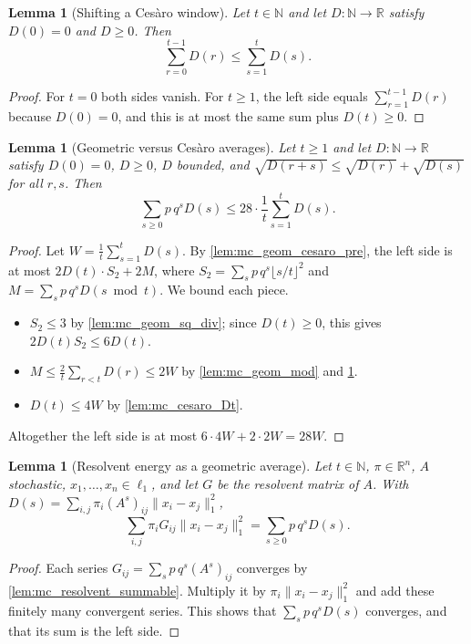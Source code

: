 \documentclass[11pt]{article}
\newtheorem{lemma}[theorem]{Lemma}
\theoremstyle{definition}
\theoremstyle{remark}
\newcommand{\R}{\mathbb{R}}
\newcommand{\N}{\mathbb{N}}
\newcommand{\lnorm}[1]{\lVert #1\rVert_{1}}
\begin{document}
\begin{lemma}[Shifting a Ces\`aro window]\label{lem:mc_range_le_Icc}
Let $t\in\N$ and let $D:\N\to\R$ satisfy $D(0)=0$ and $D\ge0$. Then
\[
\sum_{r=0}^{t-1}D(r)\le\sum_{s=1}^tD(s).
\]
\end{lemma}
\begin{proof}
For $t=0$ both sides vanish. For $t\ge1$, the left side equals $\sum_{r=1}^{t-1}D(r)$ because $D(0)=0$, and this is at most the same sum plus $D(t)\ge0$.
\end{proof}

\begin{lemma}[Geometric versus Ces\`aro averages]\label{lem:mc_geom_cesaro}
Let $t\ge1$ and let $D:\N\to\R$ satisfy $D(0)=0$, $D\ge0$, $D$ bounded, and $\sqrt{D(r+s)}\le\sqrt{D(r)}+\sqrt{D(s)}$ for all $r,s$. Then
\[
\sum_{s\ge0}p\,q^sD(s)\le28\cdot\frac1t\sum_{s=1}^tD(s).
\]
\end{lemma}
\begin{proof}
Let $W=\frac1t\sum_{s=1}^tD(s)$. By \cref{lem:mc_geom_cesaro_pre}, the left side is at most $2D(t)\cdot S_2+2M$, where $S_2=\sum_sp\,q^s\lfloor s/t\rfloor^2$ and $M=\sum_sp\,q^sD(s\bmod t)$. We bound each piece.
\begin{itemize}
\item $S_2\le3$ by \cref{lem:mc_geom_sq_div}; since $D(t)\ge0$, this gives $2D(t)S_2\le6D(t)$.
\item $M\le\frac2t\sum_{r<t}D(r)\le2W$ by \cref{lem:mc_geom_mod} and \cref{lem:mc_range_le_Icc}.
\item $D(t)\le4W$ by \cref{lem:mc_cesaro_Dt}.
\end{itemize}
Altogether the left side is at most $6\cdot4W+2\cdot2W=28W$.
\end{proof}

\begin{lemma}[Resolvent energy as a geometric average]\label{lem:mc_resolvent_D_eq}
Let $t\in\N$, $\pi\in\R^n$, $A$ stochastic, $x_1,\dots,x_n\in\ell_1$, and let $G$ be the resolvent matrix of $A$. With $D(s)=\sum_{i,j}\pi_i(A^s)_{ij}\lnorm{x_i-x_j}^2$,
\[
\sum_{i,j}\pi_iG_{ij}\lnorm{x_i-x_j}^2=\sum_{s\ge0}p\,q^sD(s).
\]
\end{lemma}
\begin{proof}
Each series $G_{ij}=\sum_sp\,q^s(A^s)_{ij}$ converges by \cref{lem:mc_resolvent_summable}. Multiply it by $\pi_i\lnorm{x_i-x_j}^2$ and add these finitely many convergent series. This shows that $\sum_sp\,q^sD(s)$ converges, and that its sum is the left side.
\end{proof}
\end{document}
